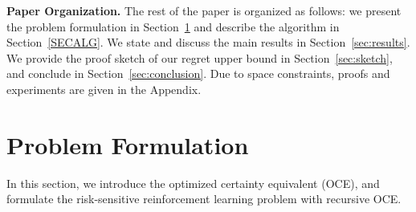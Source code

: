 \documentclass[11pt]{article}
\newcommand{\1}{\mathbbm{1}}
\newcommand{\gao}[1]{\textcolor{blue}{{#1}}} %
\begin{document}
 
 \textbf{Paper Organization.} The rest of the paper is organized as follows: 
 we present the problem formulation in Section~\ref{sec:formulation} and describe the algorithm in Section~\ref{SECALG}. We state and discuss the main results in Section~\ref{sec:results}. We provide the proof sketch of our regret upper bound in Section~\ref{sec:sketch}, and conclude in Section~\ref{sec:conclusion}. Due to space constraints, proofs and experiments are given in the Appendix. 













\section{Problem Formulation}\label{sec:formulation}
In this section, we introduce the optimized certainty equivalent (OCE), and formulate the risk-sensitive reinforcement learning problem with recursive OCE.
\end{document}

